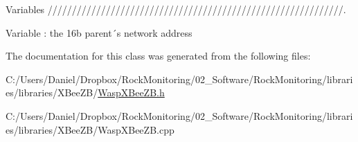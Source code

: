 Variables /////////////////////////////////////////////////////////////. 

Variable \+: the 16b parent´s network address 

The documentation for this class was generated from the following files\+:\begin{DoxyCompactItemize}
\item 
C\+:/\+Users/\+Daniel/\+Dropbox/\+Rock\+Monitoring/02\+\_\+\+Software/\+Rock\+Monitoring/libraries/libraries/\+X\+Bee\+Z\+B/\hyperlink{_wasp_x_bee_z_b_8h}{Wasp\+X\+Bee\+Z\+B.\+h}\item 
C\+:/\+Users/\+Daniel/\+Dropbox/\+Rock\+Monitoring/02\+\_\+\+Software/\+Rock\+Monitoring/libraries/libraries/\+X\+Bee\+Z\+B/Wasp\+X\+Bee\+Z\+B.\+cpp\end{DoxyCompactItemize}
